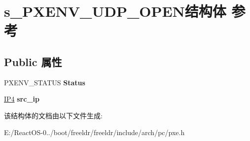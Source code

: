 \hypertarget{structs___p_x_e_n_v___u_d_p___o_p_e_n}{}\section{s\+\_\+\+P\+X\+E\+N\+V\+\_\+\+U\+D\+P\+\_\+\+O\+P\+E\+N结构体 参考}
\label{structs___p_x_e_n_v___u_d_p___o_p_e_n}
\subsection*{Public 属性}
\begin{DoxyCompactItemize}
\item 
\mbox{\label{structs___p_x_e_n_v___u_d_p___o_p_e_n_a9e9ca5ac1cb59315b5cc15a4d6b3a218}} 
P\+X\+E\+N\+V\+\_\+\+S\+T\+A\+T\+US {\bfseries Status}
\item 
\mbox{\label{structs___p_x_e_n_v___u_d_p___o_p_e_n_ae7bc10c6c9489a9cef2435468fb655b2}} 
\hyperlink{union_i_p4}{I\+P4} {\bfseries src\+\_\+ip}
\end{DoxyCompactItemize}


该结构体的文档由以下文件生成\+:\begin{DoxyCompactItemize}
\item 
E\+:/\+React\+O\+S-\/0../boot/freeldr/freeldr/include/arch/pc/pxe.\+h\end{DoxyCompactItemize}
